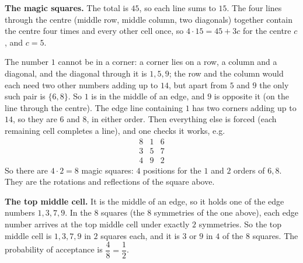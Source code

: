 \textbf{The magic squares.} The total is $45$, so each line sums to $15$. The four lines through the centre (middle row, middle column, two diagonals) together contain the centre four times and every other cell once, so $4\cdot15=45+3c$ for the centre $c$, and $c=5$.

The number $1$ cannot be in a corner: a corner lies on a row, a column and a diagonal, and the diagonal through it is $1,5,9$; the row and the column would each need two other numbers adding up to $14$, but apart from $5$ and $9$ the only such pair is $\{6,8\}$. So $1$ is in the middle of an edge, and $9$ is opposite it (on the line through the centre). The edge line containing $1$ has two corners adding up to $14$, so they are $6$ and $8$, in either order. Then everything else is forced (each remaining cell completes a line), and one checks it works, e.g.
\[\begin{array}{ccc}8&1&6\\3&5&7\\4&9&2\end{array}\]
So there are $4\cdot2=8$ magic squares: $4$ positions for the $1$ and $2$ orders of $6,8$. They are the rotations and reflections of the square above.

\textbf{The top middle cell.} It is the middle of an edge, so it holds one of the edge numbers $1,3,7,9$. In the $8$ squares (the $8$ symmetries of the one above), each edge number arrives at the top middle cell under exactly $2$ symmetries. So the top middle cell is $1,3,7,9$ in $2$ squares each, and it is $3$ or $9$ in $4$ of the $8$ squares. The probability of acceptance is $\dfrac48=\boxed{\dfrac12}$.
